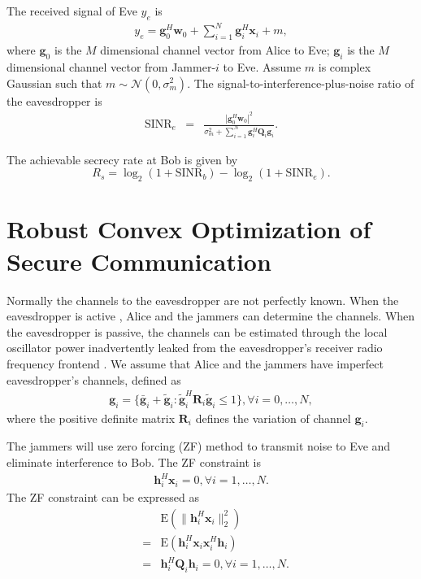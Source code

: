 \documentclass[conference]{IEEEtran}
\begin{document}
The received signal of Eve $y_e$ is
\begin{eqnarray}
y_e = \mathbf{g}_0^H\mathbf{w}_0 + \sum_{i = 1}^N\mathbf{g}_i^H\mathbf{x}_i + m,
\end{eqnarray}
where $\mathbf{g}_0$ is the $M$ dimensional channel vector from Alice to Eve; $\mathbf{g}_i$ is the $M$ dimensional channel vector from Jammer-$i$ to Eve.   Assume $m$ is complex Gaussian such that $m \sim \mathcal{N}(0,\sigma_m^2)$.
The signal-to-interference-plus-noise ratio of the eavesdropper is
\begin{eqnarray}
\mathrm{SINR}_e &=& \frac{\left| \mathbf{g}_{0}^H\mathbf{w}_{0}\right|^2}{\sigma_m^2 + \sum_{i=1}^{N}\mathbf{g}_{i}^H\mathbf{Q}_{i}\mathbf{g}_i} \label{eq:secure_capacity}.
\end{eqnarray}

The achievable secrecy rate at Bob is given by \cite{6728676}
\begin{equation}
R_s = \log_2\left(1 + \mathrm{SINR}_b\right)-\log_2\left(1 + \mathrm{SINR}_e\right).
\end{equation}


\section{Robust Convex Optimization of Secure Communication} \label{sec:robust programming}
Normally the channels to the eavesdropper are not perfectly known. When the eavesdropper is active \cite{gopala2008secrecy,feng_miso}, Alice and the jammers can determine the channels. When the eavesdropper is passive, the channels can be estimated through the local oscillator power inadvertently leaked from the eavesdropper's receiver radio frequency frontend \cite{mukherjee2012detecting,feng_miso}. We assume that  Alice and the jammers have imperfect eavesdropper's channels, defined as 
\begin{eqnarray}
\mathbf{g}_i = \{\bar{\mathbf{g}}_i + \tilde{\mathbf{g}}_i: \tilde{\mathbf{g}}_i^H \mathbf{R}_i\tilde{\mathbf{g}}_i \leq 1\},\forall i = 0,\ldots, N,
\end{eqnarray}
where the positive definite  matrix $\mathbf{R}_i $ defines the variation of channel $\mathbf{g}_i$. 

The jammers will use zero forcing (ZF) method to transmit noise to Eve and eliminate interference to Bob.
The ZF constraint is 
\begin{eqnarray}
\mathbf{h}_i^H\mathbf{x}_i =0 , \forall i = 1,\dots, N\label{eq:ZF_constraint}.
\end{eqnarray}
The ZF constraint can be expressed as
\begin{eqnarray}
&&\mathrm{E}(\|\mathbf{h}_i^H\mathbf{x}_i\|_2^2)\nonumber\\
&=&\mathrm{E}(\mathbf{h}_i^H\mathbf{x}_i\mathbf{x}_i^H\mathbf{h}_i)\nonumber\\
&=&\mathbf{h}_i^H\mathbf{Q}_i \mathbf{h}_i = 0, \forall i = 1,\ldots,N \label{eq:ZF_constraint_relaxed}.
\end{eqnarray}
\end{document}
